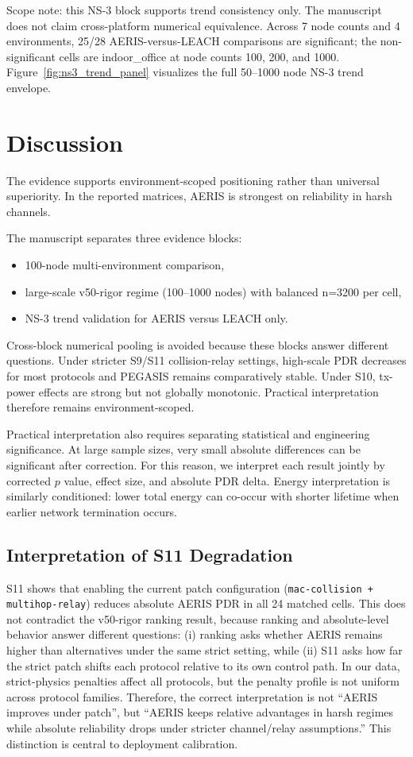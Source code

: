 ﻿\documentclass[sensors,article,submit,moreauthors,pdftex]{Definitions/mdpi}
\begin{document}
Scope note: this NS-3 block supports trend consistency only. The manuscript does not claim cross-platform numerical equivalence. Across 7 node counts and 4 environments, 25/28 AERIS-versus-LEACH comparisons are significant; the non-significant cells are indoor\_office at node counts 100, 200, and 1000.
Figure~\ref{fig:ns3_trend_panel} visualizes the full 50--1000 node NS-3 trend envelope.

\section{Discussion}
The evidence supports environment-scoped positioning rather than universal superiority. In the reported matrices, AERIS is strongest on reliability in harsh channels.

The manuscript separates three evidence blocks:
\begin{itemize}
\item 100-node multi-environment comparison,
\item large-scale v50-rigor regime (100--1000 nodes) with balanced n=3200 per cell,
\item NS-3 trend validation for AERIS versus LEACH only.
\end{itemize}
Cross-block numerical pooling is avoided because these blocks answer different questions. Under stricter S9/S11 collision-relay settings, high-scale PDR decreases for most protocols and PEGASIS remains comparatively stable. Under S10, tx-power effects are strong but not globally monotonic. Practical interpretation therefore remains environment-scoped.

Practical interpretation also requires separating statistical and engineering significance. At large sample sizes, very small absolute differences can be significant after correction. For this reason, we interpret each result jointly by corrected $p$ value, effect size, and absolute PDR delta. Energy interpretation is similarly conditioned: lower total energy can co-occur with shorter lifetime when earlier network termination occurs.

\subsection*{Interpretation of S11 Degradation}
S11 shows that enabling the current patch configuration (\texttt{mac-collision + multihop-relay}) reduces absolute AERIS PDR in all 24 matched cells. This does not contradict the v50-rigor ranking result, because ranking and absolute-level behavior answer different questions: (i) ranking asks whether AERIS remains higher than alternatives under the same strict setting, while (ii) S11 asks how far the strict patch shifts each protocol relative to its own control path. In our data, strict-physics penalties affect all protocols, but the penalty profile is not uniform across protocol families. Therefore, the correct interpretation is not ``AERIS improves under patch'', but ``AERIS keeps relative advantages in harsh regimes while absolute reliability drops under stricter channel/relay assumptions.'' This distinction is central to deployment calibration.
\end{document}
